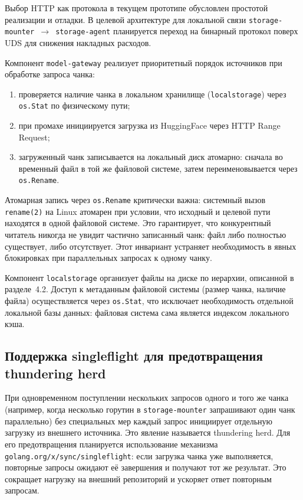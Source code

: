 Выбор HTTP как протокола в текущем прототипе обусловлен простотой реализации и отладки. В целевой архитектуре для локальной связи \texttt{storage-mounter $\to$ storage-agent} планируется переход на бинарный протокол поверх UDS для снижения накладных расходов.

Компонент \texttt{model-gateway} реализует приоритетный порядок источников при обработке запроса чанка:
\begin{enumerate}[leftmargin=*]
  \item проверяется наличие чанка в локальном хранилище (\texttt{localstorage}) через \texttt{os.Stat} по физическому пути;
  \item при промахе инициируется загрузка из HuggingFace через HTTP Range Request;
  \item загруженный чанк записывается на локальный диск атомарно: сначала во временный файл в той же файловой системе, затем переименовывается через \texttt{os.Rename}.
\end{enumerate}

Атомарная запись через \texttt{os.Rename} критически важна: системный вызов \texttt{rename(2)} на Linux атомарен при условии, что исходный и целевой пути находятся в одной файловой системе. Это гарантирует, что конкурентный читатель никогда не увидит частично записанный чанк: файл либо полностью существует, либо отсутствует. Этот инвариант устраняет необходимость в явных блокировках при параллельных запросах к одному чанку.

Компонент \texttt{localstorage} организует файлы на диске по иерархии, описанной в разделе~4.2. Доступ к метаданным файловой системы (размер чанка, наличие файла) осуществляется через \texttt{os.Stat}, что исключает необходимость отдельной локальной базы данных: файловая система сама является индексом локального кэша.

\subsection*{Поддержка singleflight для предотвращения thundering herd}

При одновременном поступлении нескольких запросов одного и того же чанка (например, когда несколько горутин в \texttt{storage-mounter} запрашивают один чанк параллельно) без специальных мер каждый запрос инициирует отдельную загрузку из внешнего источника. Это явление называется thundering herd. Для его предотвращения планируется использование механизма \texttt{golang.org/x/sync/singleflight}: если загрузка чанка уже выполняется, повторные запросы ожидают её завершения и получают тот же результат. Это сокращает нагрузку на внешний репозиторий и ускоряет ответ повторным запросам.

